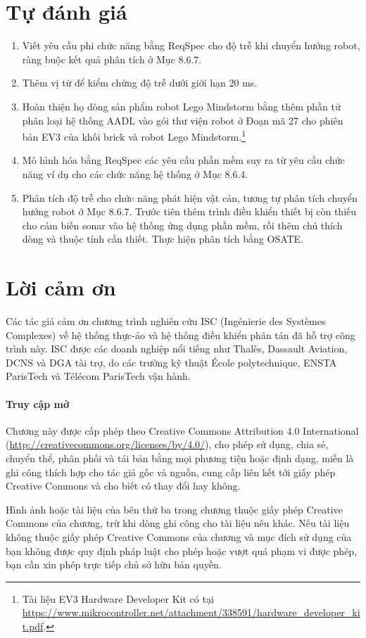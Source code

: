 \section{Tự đánh giá}
\begin{enumerate}
\item Viết yêu cầu phi chức năng bằng ReqSpec cho độ trễ khi chuyển hướng robot, ràng buộc kết quả phân tích ở Mục 8.6.7.
\item Thêm vị từ để kiểm chứng độ trễ dưới giới hạn 20 ms.
\item Hoàn thiện họ dòng sản phẩm robot Lego Mindstorm bằng thêm phần tử phân loại hệ thống AADL vào gói thư viện robot ở Đoạn mã 27 cho phiên bản EV3 của khối brick và robot Lego Mindstorm.\footnote{Tài liệu EV3 Hardware Developer Kit có tại \url{https://www.mikrocontroller.net/attachment/338591/hardware_developer_kit.pdf}.}
\item Mô hình hóa bằng ReqSpec các yêu cầu phần mềm suy ra từ yêu cầu chức năng ví dụ cho các chức năng hệ thống ở Mục 8.6.4.
\item Phân tích độ trễ cho chức năng phát hiện vật cản, tương tự phân tích chuyển hướng robot ở Mục 8.6.7. Trước tiên thêm trình điều khiển thiết bị còn thiếu cho cảm biến sonar vào hệ thống ứng dụng phần mềm, rồi thêm chú thích dòng và thuộc tính cần thiết. Thực hiện phân tích bằng OSATE.
\end{enumerate}

\section*{Lời cảm ơn}
Các tác giả cảm ơn chương trình nghiên cứu ISC (Ingénierie des Systèmes Complexes) về hệ thống thực-ảo và hệ thống điều khiển phân tán đã hỗ trợ công trình này. ISC được các doanh nghiệp nổi tiếng như Thalès, Dassault Aviation, DCNS và DGA tài trợ, do các trường kỹ thuật École polytechnique, ENSTA ParisTech và Télécom ParisTech vận hành.

\paragraph{Truy cập mở}
Chương này được cấp phép theo Creative Commons Attribution 4.0 International (\url{http://creativecommons.org/licenses/by/4.0/}), cho phép sử dụng, chia sẻ, chuyển thể, phân phối và tái bản bằng mọi phương tiện hoặc định dạng, miễn là ghi công thích hợp cho tác giả gốc và nguồn, cung cấp liên kết tới giấy phép Creative Commons và cho biết có thay đổi hay không.

Hình ảnh hoặc tài liệu của bên thứ ba trong chương thuộc giấy phép Creative Commons của chương, trừ khi dòng ghi công cho tài liệu nêu khác. Nếu tài liệu không thuộc giấy phép Creative Commons của chương và mục đích sử dụng của bạn không được quy định pháp luật cho phép hoặc vượt quá phạm vi được phép, bạn cần xin phép trực tiếp chủ sở hữu bản quyền.
